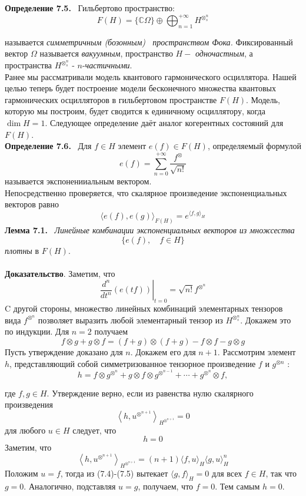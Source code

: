 \documentclass[a5paper, 16pt]{book}
\begin{document}
\noindent\textbf{Определение 7.5.} \ Гильбертово пространство:
$$
F(H)=\{\mathbb{C} \Omega\} \oplus \bigoplus_{n=1}^{+\infty} H^{\otimes_{s}^{n}}
$$

\newpage

\noindent называется \textit{симметричным (бозонным) \ пространством Фока.}  Фиксированный вектор $\Omega$ называется \textit{вакуумным}, пространство $H-$ \textit{одночастным}, а пространства $H^{\otimes_{s}^{n}}$ - $n$-\textit{частичными}.\\

Ранее мы рассматривали модель квантового гармонического осциллятора. Нашей целью теперь будет построение модели бесконечного множества квантовых гармонических осцилляторов в гильбертовом пространстве $F(H)$. Модель, которую мы построим, будет сводится к единичному осциллятору, когда $\operatorname{dim} H=1$. Следующее определение даёт аналог когерентных состояний для $F(H)$.\\

\noindent\textbf{Определение 7.6.} \ Для $f \in H$ элемент $e(f) \in F(H)$, определяемый формулой
$$
e(f)=\sum_{n=0}^{+\infty} \frac{f^{\otimes}}{\sqrt{n !}}
$$называется экспоненииальным вектором.\\

Непосредственно проверяется, что скалярное произведение экспоненциальных векторов равно
$$
\langle e(f), e(g)\rangle_{F(H)}=e^{\langle f, g\rangle_{H}}
$$
\noindent\textbf{Лемма 7.1.} \ \textit{Линейные комбинации экспоненциальных векторов из множсества}
$$
\{e(f), \quad f \in H\}
$$\textit{плотны} в $F(H)$.\\\\
\textbf{Доказательство}. Заметим, что
$$
\left.\frac{d^{n}}{d t^{n}}(e(t f))\right|_{t=0}=\sqrt{n !} f^{\otimes^{n}}
$$
C другой стороны, множество линейных комбинаций элементарных тензоров вида $f^{\otimes^{n}}$ позволяет выразить любой элементарный тензор из $H^{\otimes_{s}^{n}}$. Докажем это по индукции. Для $n=2$ получаем
$$
f \otimes g+g \otimes f=(f+g) \otimes(f+g)-f \otimes f-g \otimes g
$$
Пусть утверждение доказано для $n$. Докажем его для $n+1$. Рассмотрим элемент $h$, представляющий собой симметризованное тензорное произведение $f$ и $g^{\otimes n}$ :
$$
h=f \otimes g^{\otimes^{n}}+g \otimes f \otimes g^{\otimes^{n-1}}+\cdots+g^{\otimes^{n}} \otimes f,
$$

\newpage

\noindent где $f, g \in H$. Утверждение верно, если из равенства нулю скалярного произведения
$$
\left\langle h, u^{\otimes^{n+1}}\right\rangle_{H^{\otimes^{n+1}}}=0
$$
для любого $u \in H$ следует, что
$$
h=0
$$
Заметим, что
$$
\left\langle h, u^{\otimes^{n+1}}\right\rangle_{H^{\otimes^{n+1}}}=(n+1)\langle f, u\rangle_{H}\langle g, u\rangle_{H}^{n}
$$
Положим $u=f$, тогда из (7.4)-(7.5) вытекает $\langle g, f\rangle_{H}=0$ для всех $f \in H$, так что $g=0$. Аналогично, подставляя $u=g$, получаем, что $f=0$. Тем самым $h=0$.
\end{document}
